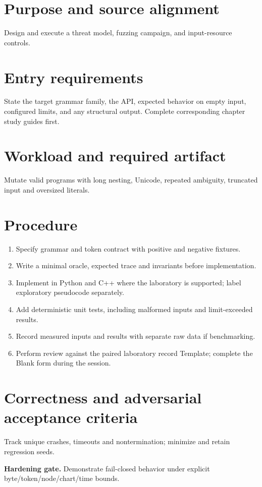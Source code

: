 \documentclass[11pt,letterpaper]{article}
\begin{document}
\makedoctitle\makedocsummary
\tableofcontents\clearpage
\section{Purpose and source alignment}
Design and execute a threat model, fuzzing campaign, and input-resource controls.
\section{Entry requirements}
State the target grammar family, the API, expected behavior on empty input, configured limits, and any structural output. Complete corresponding chapter study guides first.
\section{Workload and required artifact}
Mutate valid programs with long nesting, Unicode, repeated ambiguity, truncated input and oversized literals.
\section{Procedure}
\begin{enumerate}\item Specify grammar and token contract with positive and negative fixtures.\item Write a minimal oracle, expected trace and invariants before implementation.\item Implement in Python and C++ where the laboratory is supported; label exploratory pseudocode separately.\item Add deterministic unit tests, including malformed inputs and limit-exceeded results.\item Record measured inputs and results with separate raw data if benchmarking.\item Perform review against the paired laboratory record Template; complete the Blank form during the session.\end{enumerate}
\section{Correctness and adversarial acceptance criteria}
Track unique crashes, timeouts and nontermination; minimize and retain regression seeds.\par\textbf{Hardening gate.} Demonstrate fail-closed behavior under explicit byte/token/node/chart/time bounds.
\end{document}
